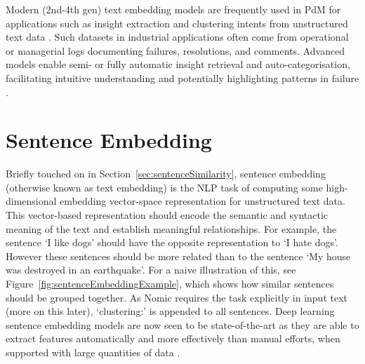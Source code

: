 \documentclass[10pt,oneside]{report}
\begin{document}

Modern (2nd-4th gen) text embedding models are frequently used in PdM for applications such as insight extraction and clustering intents from unstructured text data \cite{abijith2023large,usuga2022using}. Such datasets in industrial applications often come from operational or managerial logs documenting failures, resolutions, and comments. Advanced models enable semi- or fully automatic insight retrieval and auto-categorisation, facilitating intuitive understanding and potentially highlighting patterns in failure \cite{nota2022text}.

\section{Sentence Embedding}\label{sec:sentenceEmbedding}
Briefly touched on in Section~\ref{sec:sentenceSimilarity}, sentence embedding (otherwise known as text embedding) is the NLP task of computing some high-dimensional embedding vector-space representation for unstructured text data. This vector-based representation should encode the semantic and syntactic meaning of the text and establish meaningful relationships. For example, the sentence `I like dogs' should have the opposite representation to `I hate dogs'.  However these sentences should be more related than to the sentence `My house was destroyed in an earthquake'. For a naive illustration of this, see Figure~\ref{fig:sentenceEmbeddingExample}, which shows how similar sentences should be grouped together. As Nomic requires the task explicitly in input text (more on this later), `clustering:' is appended to all sentences. Deep learning sentence embedding models are now seen to be state-of-the-art as they are able to extract features automatically and more effectively than manual efforts, when supported with large quantities of data \cite{liang2017text}.
\end{document}
